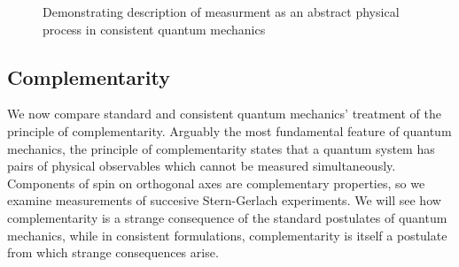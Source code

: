 \begin{figure}
\centering\CaptionFontSize
{}
\caption[Insert an abbreviated caption here to show in the List of Figures]
{Demonstrating description of measurment as an abstract physical process in consistent quantum mechanics}
\label{Figure:Intro:FigureExampleB}
\end{figure}

\subsection{Complementarity}

We now compare standard and consistent quantum mechanics' treatment of the principle of complementarity. Arguably the most fundamental feature of quantum mechanics, the principle of complementarity states that a quantum system has pairs of physical observables which cannot be measured simultaneously. Components of spin on orthogonal axes are complementary properties, so we examine measurements of succesive Stern-Gerlach experiments. We will see how complementarity is a strange consequence of the standard postulates of quantum mechanics, while in consistent formulations, complementarity is itself a postulate from which strange consequences arise.

